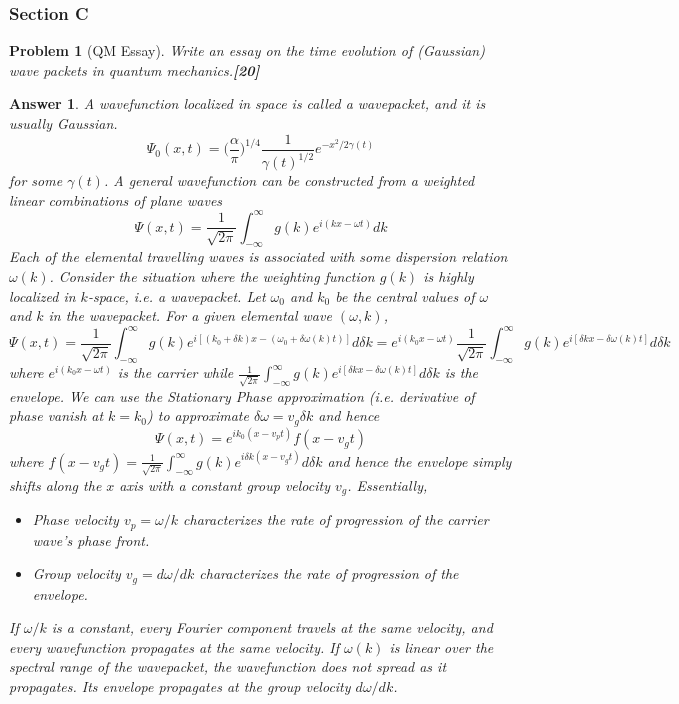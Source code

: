 \documentclass[a4paper]{article}
\newtheorem{ans}{Answer}[subsection]
\theoremstyle{new}
\newtheorem{qns}{Problem}[subsection]
\begin{document}
\subsubsection{Section C}
\begin{qns}[QM Essay]
Write an essay on the time evolution of (Gaussian) wave packets in quantum mechanics.\hfill\textbf{[20]}
\end{qns}
\begin{ans}
A wavefunction localized in space is called a wavepacket, and it is usually Gaussian.
$$\Psi_0(x,t)=\bigg(\frac{\alpha}{\pi}\bigg)^{1/4}\frac{1}{\gamma(t)^{1/2}}e^{-x^2/2\gamma(t)}$$
for some $\gamma(t)$. A general wavefunction can be constructed from a weighted linear combinations of plane waves
$$\Psi(x,t)=\frac{1}{\sqrt{2\pi}}\int_{-\infty}^\infty g(k)e^{i(kx-\omega t)}dk$$
Each of the elemental travelling waves is associated with some dispersion relation $\omega (k)$. Consider the situation where the weighting function $g(k)$ is highly localized in $k$-space, i.e. a wavepacket. Let $\omega_0$ and $k_0$ be the central values of $\omega$ and $k$ in the wavepacket. For a given elemental wave $(\omega,k)$,
$$\Psi(x,t)=\frac{1}{\sqrt{2\pi}}\int_{-\infty}^\infty g(k)e^{i[(k_0+\delta k)x-(\omega_0+\delta\omega(k)t)]}d\delta k=e^{i(k_0x-\omega t)}\frac{1}{\sqrt{2\pi}}\int_{-\infty}^\infty g(k)e^{i[\delta k x-\delta\omega(k)t]}d\delta k$$
where $e^{i(k_0x-\omega t)}$ is the carrier while $\frac{1}{\sqrt{2\pi}}\int_{-\infty}^\infty g(k)e^{i[\delta k x-\delta\omega(k)t]}d\delta k$ is the envelope. We can use the Stationary Phase approximation (i.e. derivative of phase vanish at $k=k_0$) to approximate $\delta\omega=v_g\delta k$ and hence
$$\Psi(x,t)=e^{ik_0(x-v_pt)}f(x-v_gt)$$
where $f(x-v_gt)=\frac{1}{\sqrt{2\pi}}\int_{-\infty}^\infty g(k)e^{i\delta k(x-v_gt)}d\delta k$ and hence the envelope simply shifts along the $x$ axis with a constant group velocity $v_g$. Essentially,
\begin{itemize}
    \item Phase velocity $v_p=\omega/k$ characterizes the rate of progression of the carrier wave's phase front.
    \item Group velocity $v_g=d\omega/dk$ characterizes the rate of progression of the envelope.
\end{itemize}
If $\omega/k$ is a constant, every Fourier component travels at the same velocity, and every wavefunction propagates at the same velocity. If $\omega(k)$ is linear over the spectral range of the wavepacket, the wavefunction does not spread as it propagates. Its envelope propagates at the group velocity $d\omega/dk$.\\[5pt]

\end{ans}
\end{document}
